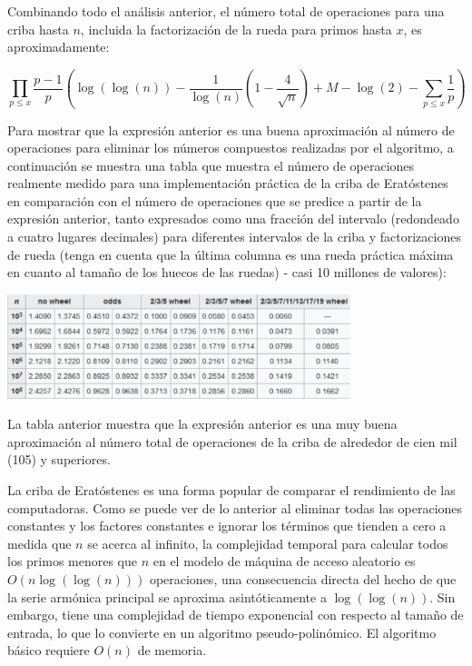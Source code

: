 \documentclass[12pt]{article}
\newcommand{\nl}{\vspace{0.3cm}}
\begin{document}
\nl

Combinando todo el análisis anterior, el número total de operaciones para una criba hasta $n$, incluida la factorización de la rueda para primos hasta $x$, es aproximadamente:

$$ \prod_{p \leqslant x}\frac{p - 1}{p} \left( \log(\log(n)) - \frac{1}{\log(n)} \left(1  -\frac{4}{\sqrt{n}}\right) + M - \log(2) - \sum_{p \leqslant x}\frac{1}{p} \right) $$

Para mostrar que la expresión anterior es una buena aproximación al número de operaciones para eliminar los números compuestos realizadas por el algoritmo, a continuación se muestra una tabla que muestra el número de operaciones realmente medido para una implementación práctica de la criba de Eratóstenes en comparación con el número de operaciones que se predice a partir de la expresión anterior, tanto expresados como una fracción del intervalo (redondeado a cuatro lugares decimales) para diferentes intervalos de la criba y factorizaciones de rueda (tenga en cuenta que la última columna es una rueda práctica máxima en cuanto al tamaño de los huecos de las ruedas) - casi 10 millones de valores):

\begin{center}
	\includegraphics[width=10cm]{images/table1.png}
\end{center}

La tabla anterior muestra que la expresión anterior es una muy buena aproximación al número total de operaciones de la criba de alrededor de cien mil (105) y superiores.

\nl

La criba de Eratóstenes es una forma popular de comparar el rendimiento de las computadoras. \cite{ompts} Como se puede ver de lo anterior al eliminar todas las operaciones constantes y los factores constantes e ignorar los términos que tienden a cero a medida que $n$ se acerca al infinito, la complejidad temporal para calcular todos los primos menores que $n$ en el modelo de máquina de acceso aleatorio es $O(n\log(\log(n)))$ operaciones, una consecuencia directa del hecho de que la serie armónica principal se aproxima asintóticamente a $\log(\log(n))$. Sin embargo, tiene una complejidad de tiempo exponencial con respecto al tamaño de entrada, lo que lo convierte en un algoritmo pseudo-polinómico. El algoritmo básico requiere $O(n)$ de memoria.
\end{document}
